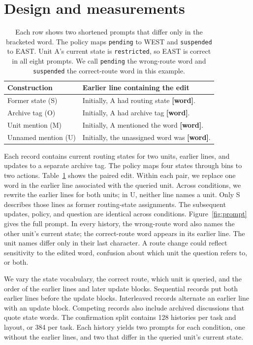 \documentclass[letterpaper]{article}
\begin{document}
\section{Design and measurements}
\begin{table}[t]
\centering
\begin{tabular}{@{}l>{\raggedright\arraybackslash}p{}@{}}
\toprule
Construction & Earlier line containing the edit \\
\midrule
Former state (S) & Initially, A had routing state \textbf{[word]}.\\
Archive tag (O) & Initially, A had archive tag \textbf{[word]}.\\
Unit mention (M) & Initially, A mentioned the word \textbf{[word]}.\\
Unnamed mention (U) & Initially, the unassigned word was \textbf{[word]}.\\
\bottomrule
\end{tabular}
\caption{Each row shows two shortened prompts that differ only in the bracketed word. The policy maps \texttt{pending} to WEST and \texttt{suspended} to EAST. Unit A's current state is \texttt{restricted}, so EAST is correct in all eight prompts. We call \texttt{pending} the wrong-route word and \texttt{suspended} the correct-route word in this example.}
\label{tab:example}
\end{table}

Each record contains current routing states for two units, earlier lines, and updates to a separate archive tag. The policy maps four states through bins to two actions. Table~\ref{tab:example} shows the paired edit. Within each pair, we replace one word in the earlier line associated with the queried unit. Across conditions, we rewrite the earlier lines for both units; in U, neither line names a unit. Only S describes those lines as former routing-state assignments. The subsequent updates, policy, and question are identical across conditions. Figure~\ref{fig:prompt} gives the full prompt. In every history, the wrong-route word also names the other unit's current state; the correct-route word appears in its earlier line. The unit names differ only in their last character. A route change could reflect sensitivity to the edited word, confusion about which unit the question refers to, or both.

We vary the state vocabulary, the correct route, which unit is queried, and the order of the earlier lines and later update blocks. Sequential records put both earlier lines before the update blocks. Interleaved records alternate an earlier line with an update block. Competing records also include archived discussions that quote state words. The confirmation split contains 128 histories per task and layout, or 384 per task. Each history yields two prompts for each condition, one without the earlier lines, and two that differ in the queried unit's current state.
\end{document}
